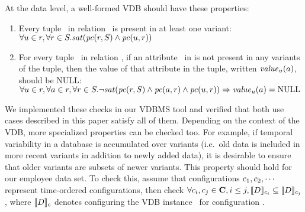 \noindent
%
At the data level, a well-formed VDB should have these properties:
%
\begin{enumerate}
%
\item Every tuple \vTuple\ in relation \vRel\ is present in at least one variant:
%
$\forall\vTuple\in\vRel, \forall\vRel\in\vSch.
\sat{\getPCfrom\vRel \vSch\wedge\getPCfrom \vTuple \vRel}$ 
%
\item For every tuple \vTuple\ in relation \vRel, if an attribute \vAtt\ in \vRel is
not present in any variants of the tuple, then the value of that attribute in
the tuple, written $\mathit{value}_\vTuple(\vAtt)$, should be NULL:
$\forall\vTuple\in\vRel, \forall\vAtt\in\vRel, \forall\vRel\in\vSch.
\neg\sat{\getPCfrom \vRel \vSch \wedge\getPCfrom \vAtt \vRel\wedge\getPCfrom \vTuple \vRel}
\Rightarrow \mathit{value}_\vTuple(\vAtt) = \text{NULL}$
%
\end{enumerate}


\noindent
%
We implemented these checks in our VDBMS tool and verified that both use cases
described in this paper satisfy all of them. 
%
Depending on the context of the VDB, more specialized properties can be checked
too. For example, if temporal variability in a database is accumulated over
variants (i.e.\ old data is included in more recent variants in addition to
newly added data), it is desirable to ensure that older variants are subsets of
newer variants.
%
This property should hold for our employee data set. To check this, 
assume that configurations \ensuremath{\config_1, \config_2, \cdots}
represent time-ordered configurations, then check
\ensuremath{
\forall \config_i, \config_j \in \confSet, i \le j, \sem[\config_i] {\vDB} \subseteq \sem[\config_j]{\vDB}
}, 
where \ensuremath{\sem[\config]{\vDB}} denotes configuring the VDB instance
\vDB\ for configuration \config. 



